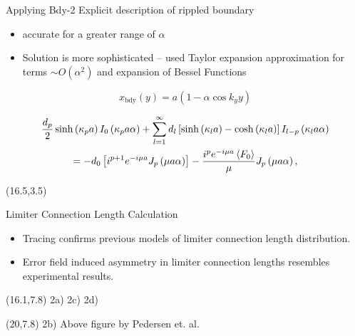 \documentclass{beamer}
\begin{document}
\begin{frame}[t]
\begin{textblock}{15}
\begin{block}{Applying Bdy-2}
Explicit description of rippled boundary
\begin{itemize}
    \item accurate for a greater range of $\alpha$ 
    \item Solution is more sophisticated -- used Taylor expansion approximation for terms $\sim O(\alpha^2)$ and expansion of Bessel Functions
\end{itemize}
\begin{equation}
    \label{eq:bdy2}
    x_{\text{bdy}}\left( y \right) =a\left( 1-\alpha\cos{k_y y} \right) 
\end{equation} 

\begin{multline}
        \frac{d_p}{2}\sinh\left(\kappa_p a\right)I_{0}\left(\kappa_p a \alpha\right)+\sum_{l=1}^{\infty}d_l\left[ \sinh\left(\kappa_l a\right)-\cosh\left(\kappa_l a\right) \right]I_{l-p}\left(\kappa_l a \alpha\right)\\
        = -d_0\left[i^{p+1}e^{-i\mu a}J_{p}\left(\mu a \alpha\right)\right]-\frac{i^p e^{-i\mu a}\left\langle F_0 \right\rangle}{\mu}J_{p}\left(\mu a \alpha\right),\label{eq2.42}
\end{multline}
    
\end{block}

\break
\end{textblock}



\begin{textblock}{15}(16.5,3.5)
{\Large
\begin{block}{Limiter Connection Length Calculation}
\begin{itemize}
\item Tracing confirms previous models of limiter connection length distribution\cite{pederson}.
\item Error field induced asymmetry in limiter connection lengths resembles experimental results.
\end{itemize}
\end{block}
}
\end{textblock}




\begin{textblock}{18}(16.1,7.8)
2a)\break
2c)\break
2d)\break
\end{textblock}
\begin{textblock}{18}(20,7.8)
2b)\break\break
Above figure by Pedersen et. al.\cite{pederson}
\end{textblock}





\end{frame}
\end{document}
